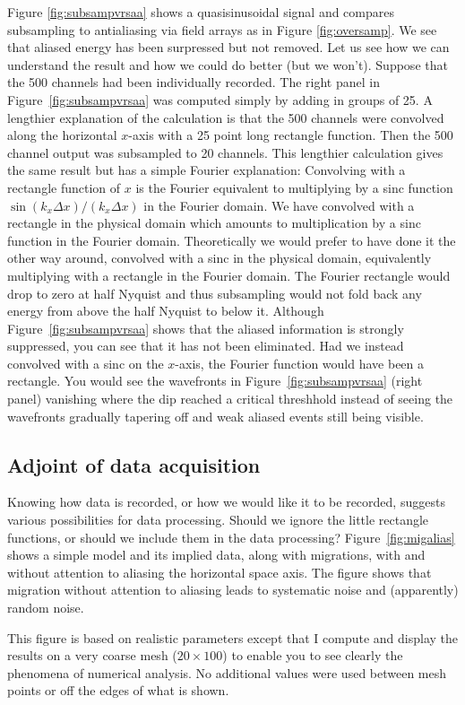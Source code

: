 \par
Figure \ref{fig:subsampvrsaa} shows a quasisinusoidal signal
and compares subsampling to antialiasing
via field arrays as in
Figure \ref{fig:oversamp}.
We see that aliased energy has been surpressed but not removed.
Let us see how we can understand the result
and how we could do better (but we won't).
Suppose that the 500 channels had been individually recorded.
The right panel in
Figure~\ref{fig:subsampvrsaa}
was computed simply by adding in groups of 25.
A lengthier explanation of the calculation
is that the 500 channels were convolved along
the horizontal $x$-axis with a 25 point long rectangle function.
Then the 500 channel output was subsampled to 20 channels.
This lengthier calculation gives the same result
but has a simple Fourier explanation:
Convolving with a rectangle function of $x$
is the Fourier equivalent to multiplying by a sinc function
$\sin(k_x \Delta x) /(k_x \Delta x)$
in the Fourier domain.
We have convolved with a rectangle in the physical domain
which amounts to multiplication by a sinc function in the Fourier domain.
Theoretically we would prefer to have done it the other way around,
convolved with a sinc in the physical domain, equivalently
multiplying with a rectangle in the Fourier domain.
The Fourier rectangle would drop to zero at half Nyquist
and thus subsampling would not fold back any energy from
above the half Nyquist to below it.
Although Figure~\ref{fig:subsampvrsaa} shows that the aliased
information is strongly suppressed, you can see that it
has not been eliminated.
Had we instead convolved with a sinc on the $x$-axis,
the Fourier function would have been a rectangle.
You would see the wavefronts in
Figure~\ref{fig:subsampvrsaa} (right panel)
vanishing where the dip reached a critical threshhold
instead of seeing the wavefronts gradually tapering off
and weak aliased events still being visible.


\subsection{Adjoint of data acquisition}
Knowing how data is recorded,
or how we would like it to be recorded,
suggests various possibilities for data processing.
Should we ignore the little rectangle functions,
or should we include them in the data processing?
Figure~\ref{fig:migalias} shows a simple model and its implied data,
along with migrations,
with and without attention to aliasing the horizontal space axis.
The figure shows that migration without attention to aliasing
leads to systematic noise and (apparently) random noise.
\par
This figure is based on realistic parameters
except that I compute and display the results
on a very coarse mesh ($20\times 100$)
to enable you to see clearly the phenomena of numerical analysis.
No additional values were used between mesh points
or off the edges of what is shown.

